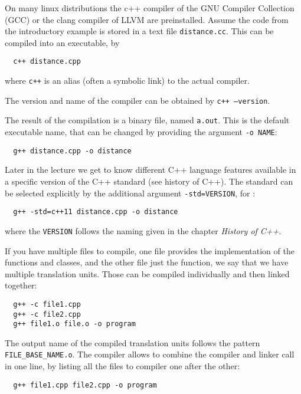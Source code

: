 On many linux distributions the c++ compiler of the GNU Compiler Collection (GCC) or the clang compiler of LLVM are preinstalled.
Assume the code from the introductory example is stored in a text file \texttt{distance.cc}. This can be compiled into an executable, by
%
\begin{verbatim}
  c++ distance.cpp
\end{verbatim}
%
where \texttt{c++} is an alias (often a symbolic link) to the actual compiler.

\begin{rem}
  The version and name of the compiler can be obtained by \texttt{c++ --version}.
\end{rem}

The result of the compilation is a binary file, named \texttt{a.out}. This is the default executable name, that can be changed by
providing the argument \texttt{-o NAME}:
%
\begin{verbatim}
  g++ distance.cpp -o distance
\end{verbatim}
%
Later in the lecture we get to know different C++ language features available in a specific version of the C++ standard (see history of C++).
The standard can be selected explicitly by the additional argument \texttt{-std=VERSION}, \eg for :
%
\begin{verbatim}
  g++ -std=c++11 distance.cpp -o distance
\end{verbatim}
%
where the \texttt{VERSION} follows the naming given in the chapter \emph{History of C++}.

If you have multiple files to compile, \eg one file provides the implementation of the functions and classes, and the other file just
the  function, we say that we have multiple translation units. Those can be compiled individually and then linked together:
%
\begin{verbatim}
  g++ -c file1.cpp
  g++ -c file2.cpp
  g++ file1.o file.o -o program
\end{verbatim}
%
The output name of the compiled translation units follows the pattern \texttt{FILE\_BASE\_NAME.o}. The compiler allows to combine the compiler
and linker call in one line, by listing all the files to compiler one after the other:
%
\begin{verbatim}
  g++ file1.cpp file2.cpp -o program
\end{verbatim}

